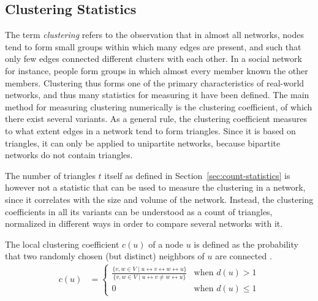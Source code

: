 \documentclass{article}
\begin{document}
\subsection{Clustering Statistics}
\label{sec:statistic:clustering}
The term \emph{clustering} refers to the observation that in almost all
networks, nodes tend to form small groups within which many edges are
present, and such that only few edges connected different clusters with
each other.  In a social network for instance, people form groups in
which almost every member known the other members.  Clustering thus
forms one of the primary characteristics of real-world networks, and
thus many statistics for measuring it have been defined.  The main
method for measuring clustering numerically is the clustering
coefficient, of which there exist several variants. As a general rule,
the clustering coefficient measures to what extent edges in a network
tend to form triangles. Since it is based on triangles, it can only be
applied to unipartite networks, because bipartite networks do not
contain triangles.

The number of triangles $t$ itself as defined in
Section~\ref{sec:count-statistics} is however not a statistic that can
be used to measure the clustering in a network, since it correlates with
the size and volume of the network.  Instead, the clustering
coefficients in all its variants can be understood as a count of
triangles, normalized in different ways in order to compare several
networks with it.

The local clustering coefficient $c(u)$ of a node $u$ is defined as the
probability that two randomly chosen (but distinct) neighbors of $u$ are
connected \citep{b228}.
\begin{align}
  c(u) &= \left\{ \begin{array}{ll} \frac { \{ v, w \in V \mid u \leftrightarrow v
      \leftrightarrow w \leftrightarrow u \} } { \{ v, w \in V \mid u \leftrightarrow v \neq w \leftrightarrow u \}
    } & \text{when } d(u) > 1 \\ 0 & \text{when } d(u) \leq 1
          \end{array} \right. 
\end{align}
\end{document}

